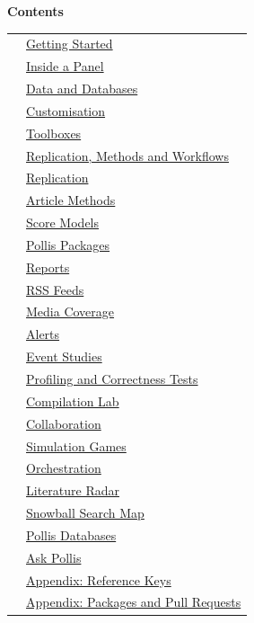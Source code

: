 \documentclass[10pt,a4paper,twoside]{article}
\newcommand{\contentsentry}[1]{{\color{deepamber}\bfseries\hyperlink{topic:#1}{\pageref*{topic:#1}}} & \hyperlink{topic:#1}{#1}}
\begin{document}
\begin{minipage}[t]{0.40\linewidth}\vspace{0pt}
\begin{tcolorbox}[enhanced, colback=white, colframe=amber, boxrule=0pt, leftrule=2pt, sharp corners,
  left=8pt, right=0pt, top=2pt, bottom=2pt]
{\color{navy}\large\bfseries Contents}\par\medskip
\renewcommand{\arraystretch}{1.25}
\begin{tabular}{@{}r@{\enspace}l@{}}
\contentsentry{Getting Started}\\
\contentsentry{Inside a Panel}\\
\contentsentry{Data and Databases}\\
\contentsentry{Customisation}\\
\contentsentry{Toolboxes}\\
\contentsentry{Replication, Methods and Workflows}\\
\contentsentry{Replication}\\
\contentsentry{Article Methods}\\
\contentsentry{Score Models}\\
\contentsentry{Pollis Packages}\\
\contentsentry{Reports}\\
\contentsentry{RSS Feeds}\\
\contentsentry{Media Coverage}\\
\contentsentry{Alerts}\\
\contentsentry{Event Studies}\\
\contentsentry{Profiling and Correctness Tests}\\
\contentsentry{Compilation Lab}\\
\contentsentry{Collaboration}\\
\contentsentry{Simulation Games}\\
\contentsentry{Orchestration}\\
\contentsentry{Literature Radar}\\
\contentsentry{Snowball Search Map}\\
\contentsentry{Pollis Databases}\\
\contentsentry{Ask Pollis}\\
\contentsentry{Appendix: Reference Keys}\\
\contentsentry{Appendix: Packages and Pull Requests}
\end{tabular}
\end{tcolorbox}
\end{minipage}
\end{document}
